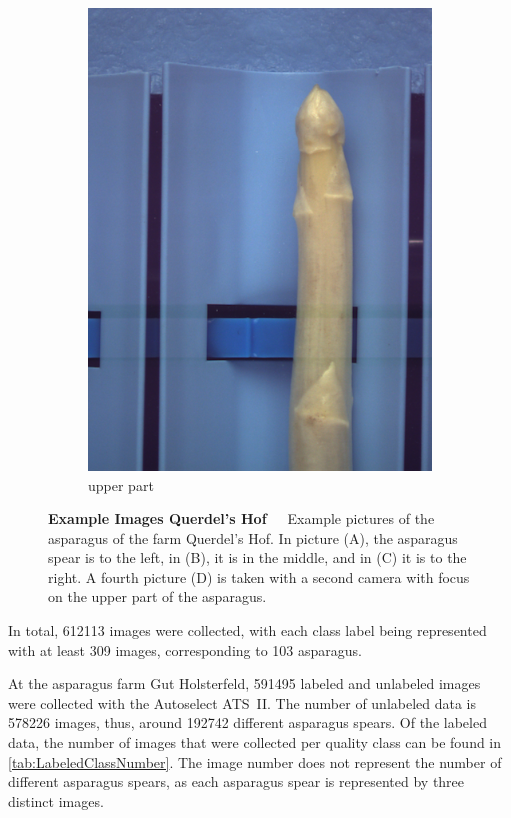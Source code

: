 \begin{figure}[!ht]
	\begin{subfigure}{0.3\textwidth}
		\vspace{10pt}
		\includegraphics[width=0.9\linewidth]{Figures/chapter02/querdel_d.png}
		\caption{upper part}
	\end{subfigure}
    \caption[Example Asparagus Images Querdel's Hof]{\textbf{Example Images Querdel's Hof}~~~Example pictures of the asparagus of the farm Querdel's Hof. In picture (A), the asparagus spear is to the left, in (B), it is in the middle, and in (C) it is to the right. A fourth picture (D) is taken with a second camera with focus on the upper part of the asparagus.}
    \label{fig:ExampleImagesQuerdel}
\end{figure}

\bigskip
In total, 612113 images were collected, with each class label being represented with at least 309 images, corresponding to 103 asparagus.

At the asparagus farm Gut Holsterfeld, 591495 labeled and unlabeled images were collected with the Autoselect ATS~II. The number of unlabeled data is 578226 images, thus, around 192742 different asparagus spears. Of the labeled data, the number of images that were collected per quality class can be found in \autoref{tab:LabeledClassNumber}. The image number does not represent the number of different asparagus spears, as each asparagus spear is represented by three distinct images.

